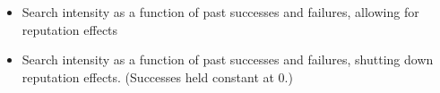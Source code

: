 \documentclass[notes=show]{beamer}
\begin{document}
\begin{frame}%


\begin{itemize}
\item Search intensity as a function of past successes and failures,
allowing for reputation effects%
\end{itemize}

\end{frame}%
\begin{frame}%


\begin{itemize}
\item Search intensity as a function of past successes and failures,
shutting down reputation effects. (Successes held constant at 0.)%
\end{itemize}

\end{frame}%
\end{document}
